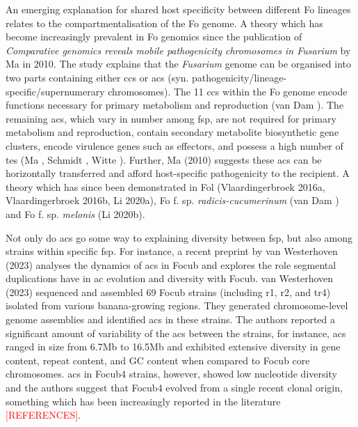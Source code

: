 An emerging explanation for shared host specificity between different \ac{Fo} lineages relates to the compartmentalisation of the \acl{Fo} genome. A theory which has become increasingly prevalent in \ac{Fo} genomics since the publication of \textit{Comparative genomics reveals mobile pathogenicity chromosomes in Fusarium} by Ma \et in 2010. The study explains that the \textit{Fusarium} genome can be organised into two parts containing either \acp{cc} or \acp{ac} (syn. pathogenicity/lineage-specific/supernumerary chromosomes). The 11 \acp{cc} within the \ac{Fo} genome encode functions necessary for primary metabolism and reproduction (van Dam ).  The remaining \acp{ac}, which vary in number among \ac{fsp}, are not required for primary metabolism and reproduction, contain secondary metabolite biosynthetic gene clusters, encode virulence genes such as effectors, and possess a high number of \acp{te} (Ma , Schmidt , Witte ). Further, Ma \et (2010) suggests these \acp{ac} can be horizontally transferred and afford host-specific pathogenicity to the recipient. A theory which has since been demonstrated in \ac{Fol} (Vlaardingerbroek \et 2016a, Vlaardingerbroek \et 2016b, Li \et 2020a), \ac{Fo} f. sp. \textit{radicis-cucumerinum} (van Dam ) and \ac{Fo} f. sp. \textit{melonis} (Li \et 2020b). 

 
Not only do \acp{ac} go some way to explaining diversity between \ac{fsp}, but also among strains within specific \ac{fsp}. For instance, a recent preprint by van Westerhoven \et (2023) analyses the dynamics of \acp{ac} in \ac{Focub} and explores the role segmental duplications have in \ac{ac} evolution and diversity with \ac{Focub}. van Westerhoven \et (2023) sequenced and assembled 69 \ac{Focub} strains (including \ac{r1}, \ac{r2}, and \ac{tr4})  isolated from various banana-growing regions. They generated chromosome-level genome assemblies and identified \acp{ac} in these strains. The authors reported a significant amount of variability of the \acp{ac} between the strains, for instance, \acp{ac} ranged in size from 6.7Mb to 16.5Mb and exhibited extensive diversity in gene content, repeat content, and GC content when compared to \ac{Focub} core chromosomes. \Acp{ac} in \ac{Focub4} strains, however, showed low nucleotide diversity and the authors suggest that \ac{Focub4} evolved from a single recent clonal origin, something which has been increasingly reported in the literature \textcolor{red}{[REFERENCES]}. 

